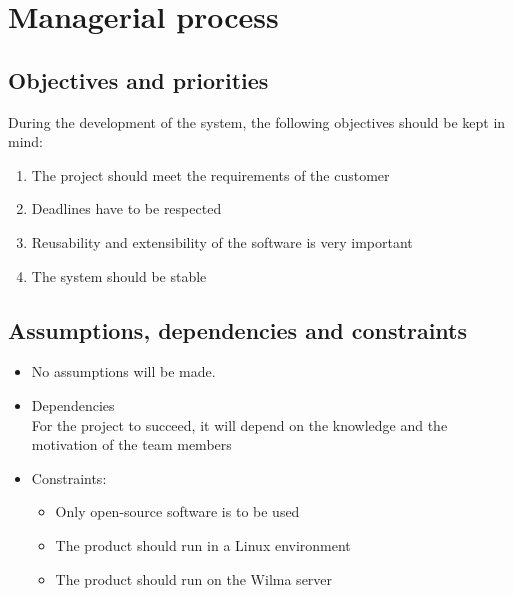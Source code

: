 \chapter{Managerial process}
		
		\section{Objectives and priorities}
			
			During the development of the system, the following objectives should be kept
			in mind:
			
			\begin{enumerate}
				
				\item The project should meet the requirements of the customer
				\item Deadlines have to be respected
				\item Reusability and extensibility of the software is very important
				\item The system should be stable
				
			\end{enumerate}	
			
		\section{Assumptions, dependencies and constraints}
			
			\begin{itemize}
				
				\item No assumptions will be made.
				
				\item Dependencies \\
 					  For the project to succeed, it will depend on
					  the knowledge and the motivation of the team members	
				
				\item Constraints:
				\begin{itemize}
					\item Only open-source software is to be used
					\item The product should run in a Linux environment
					\item The product should run on the Wilma server
				\end{itemize}
				
			\end{itemize}	
			
